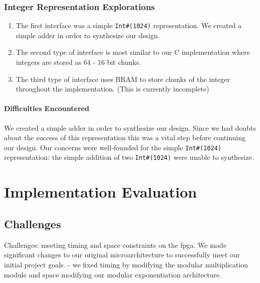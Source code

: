 \documentclass[a4paper,11pt]{report}
\begin{document}
\subsection{Integer Representation Explorations}
\begin{enumerate}
\item The first interface was a simple {\tt Int\#(1024)} representation. We created a simple adder in order to synthesize our design.
\item The second type of interface is most similar to our C implementation where integers are stored as 64 - 16 bit chunks.
\item The third type of interface uses BRAM to store chunks of the integer throughout the implementation. (This is currently incomplete)
\end{enumerate}
\subsubsection{Difficulties Encountered}
We created a simple adder in order to synthesize our design.  Since we had doubts about the success of this representation this was a vital step before continuing our design. Our concerns were well-founded for the simple {\tt Int\#(1024)} representation: the simple addition of two {\tt Int\#(1024)} were unable to synthesize.
\chapter*{Implementation Evaluation}

\section{Challenges}
Challenges: meeting timing and space constraints on the fpga. We made significant changes to our original microarchitecture to successfully meet our initial project goals.  
 - we fixed timing by modifying the modular multiplication module and space modifying our modular exponentiation architecture.
 
\end{document}
